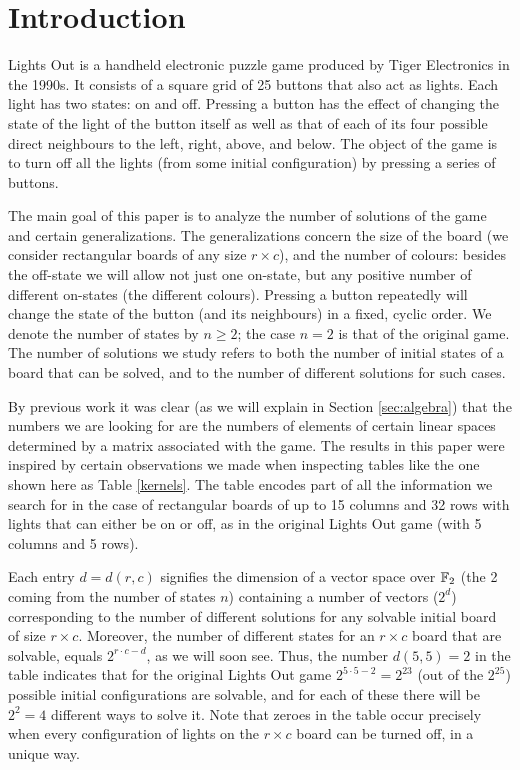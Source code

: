 \section*{Introduction}\label{sec:intro}
Lights Out is a handheld electronic puzzle game produced by Tiger Electronics in
the 1990s. It consists of a square grid of 25 buttons that also act as lights.
Each light has two states: on and off.  Pressing a button has the effect of
changing the state of the light of the button itself as well as that of each of
its four possible direct neighbours to the left, right, above, and below.
The object of the game is to turn off all the lights (from some initial
configuration) by pressing a series of buttons.

The main goal of this paper is to analyze the number of
solutions of the game and certain generalizations.
The generalizations concern the size of the board (we consider
rectangular boards of any size $r\times c$), and the number of colours:
besides the off-state we will allow not just one on-state,
but any positive number of different on-states (the different
colours). Pressing a button repeatedly will change the state
of the button (and its neighbours) in a fixed, cyclic order.
We denote the number of states by $n\geq 2$; the case $n=2$
is that of the original game.
The number of solutions we study refers to both the number of
initial states of a board that can be solved, and to the number
of different solutions for such cases.

By previous work it was clear (as we will explain in
Section \ref{sec:algebra}) that the numbers we are looking for
are the numbers of elements of certain linear spaces determined
by a matrix associated with the game. The results in this paper
were inspired by certain observations we made when inspecting
tables like the one shown here as Table \ref{kernels}.
The table encodes part of all the information we search for
in the case of rectangular boards of up to 15 columns and
32 rows with lights that can either be on or off, as in the
original Lights Out game (with 5 columns and 5 rows).

Each entry $d=d(r, c)$ signifies the dimension of a vector
space over $\mathbb F_2$ (the 2 coming from the number of states $n$)
containing a number of vectors ($2^d$) corresponding to
the number of different solutions for any solvable initial board
of size $r\times c$.
Moreover, the number of different states for an $r\times c$ board
that are solvable, equals $2^{r\cdot c-d}$, as we will soon see.
Thus, the number $d(5,5)=2$ in the table indicates that for
the original Lights Out game $2^{5\cdot 5-2}=2^{23}$ (out of the $2^{25}$)
possible initial configurations are solvable,
and for each of these there will be $2^2=4$ different ways
to solve it.
Note that zeroes in the table occur precisely when 
every configuration of lights on the $r\times c$ board can be
turned off, in a unique way.

